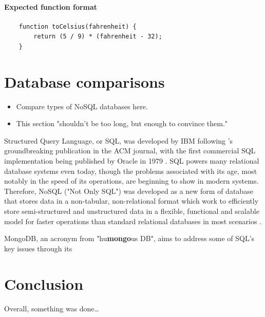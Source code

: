 \documentclass[12pt]{report}
\begin{document}
\vspace{10pt}

\subsubsection{Expected function format}

\begin{verbatim}
    function toCelsius(fahrenheit) {
        return (5 / 9) * (fahrenheit - 32);
    }
\end{verbatim}

\chapter{Database comparisons}
\begin{itemize}
    \item Compare types of NoSQL databases here.
    \item This section "shouldn't be too long, but enough to convince them."
\end{itemize}

\noindent Structured Query Language, or SQL, was developed by IBM following \textcite{codd_relational_1970}'s groundbreaking 
publication in the ACM journal, with the first commercial SQL implementation being published by Oracle in 1979 \autocite{oracle_history_nodate}.
SQL powers many relational database systems even today, though the problems associated with its age, most notably in 
the speed of its operations, are beginning to show in modern systems. Therefore, NoSQL ("Not Only SQL") was developed as 
a new form of database that stores data in a non-tabular, non-relational format which work to efficiently store 
semi-structured and unstructured data in a flexible, functional and scalable model for faster operations than standard 
relational databases in most scenarios \autocite{google_cloud_what_nodate, aws_what_nodate}. 

MongoDB, an acronym from "hu\textbf{mongo}us DB", aims to address some of SQL's key issues through its 

\chapter*{Conclusion}

Overall, something was done\dots


\printbibliography
{}
\end{document}

